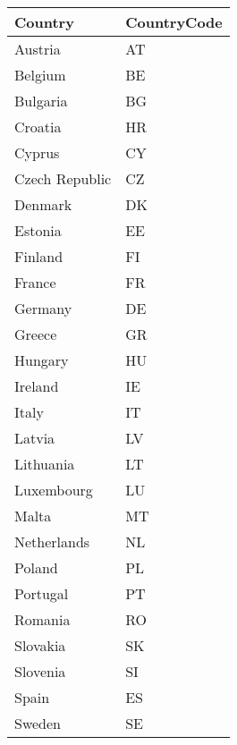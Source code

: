 \begin{tabular}{ll}
\toprule
Country & CountryCode \\
\midrule
Austria & AT \\
Belgium & BE \\
Bulgaria & BG \\
Croatia & HR \\
Cyprus & CY \\
Czech Republic & CZ \\
Denmark & DK \\
Estonia & EE \\
Finland & FI \\
France & FR \\
Germany & DE \\
Greece & GR \\
Hungary & HU \\
Ireland & IE \\
Italy & IT \\
Latvia & LV \\
Lithuania & LT \\
Luxembourg & LU \\
Malta & MT \\
Netherlands & NL \\
Poland & PL \\
Portugal & PT \\
Romania & RO \\
Slovakia & SK \\
Slovenia & SI \\
Spain & ES \\
Sweden & SE \\
\bottomrule
\end{tabular}
